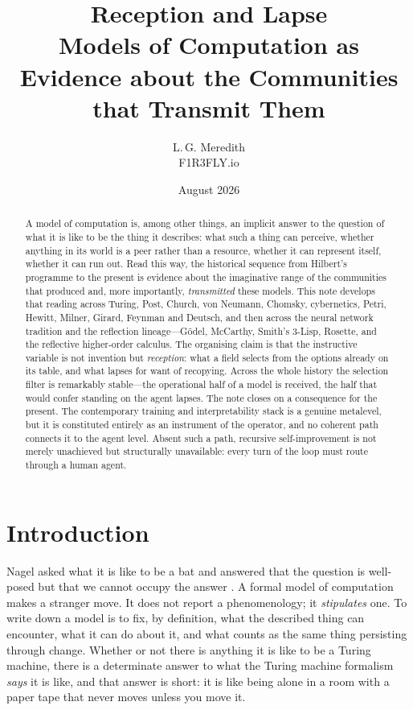 \documentclass[11pt,a4paper]{article}
\title{\bfseries Reception and Lapse\\[0.3em]
\large Models of Computation as Evidence about the Communities\\ that Transmit Them}
\author{L.\,G. Meredith\\ \small F1R3FLY.io}
\date{\small August 2026}
\begin{document}
\maketitle

\begin{abstract}
\noindent A model of computation is, among other things, an implicit answer to the
question of what it is like to be the thing it describes: what such a thing can
perceive, whether anything in its world is a peer rather than a resource, whether
it can represent itself, whether it can run out. Read this way, the historical
sequence from Hilbert's programme to the present is evidence about the
imaginative range of the communities that produced and, more importantly,
\emph{transmitted} these models. This note develops that reading across Turing,
Post, Church, von Neumann, Chomsky, cybernetics, Petri, Hewitt, Milner, Girard, Feynman
and Deutsch, and then across the neural network tradition and the reflection
lineage---G\"odel, McCarthy, Smith's 3-Lisp, Rosette,
and the reflective higher-order calculus. The organising claim is that the
instructive variable is not invention but \emph{reception}: what a field selects
from the options already on its table, and what lapses for want of recopying.
Across the whole history the selection filter is remarkably stable---the
operational half of a model is received, the half that would confer standing on
the agent lapses. The note closes on a consequence for the present. The
contemporary training and interpretability stack is a genuine metalevel, but it
is constituted entirely as an instrument of the operator, and no coherent path
connects it to the agent level. Absent such a path, recursive self-improvement
is not merely unachieved but structurally unavailable: every turn of the loop
must route through a human agent.
\end{abstract}

\section{Introduction}

Nagel asked what it is like to be a bat and answered that the question is
well-posed but that we cannot occupy the answer \cite{nagel1974}. A formal model
of computation makes a stranger move. It does not report a phenomenology; it
\emph{stipulates} one. To write down a model is to fix, by definition, what the
described thing can encounter, what it can do about it, and what counts as the
same thing persisting through change. Whether or not there is anything it is like
to be a Turing machine, there is a determinate answer to what the Turing machine
formalism \emph{says} it is like, and that answer is short: it is like being
alone in a room with a paper tape that never moves unless you move it.
\end{document}
